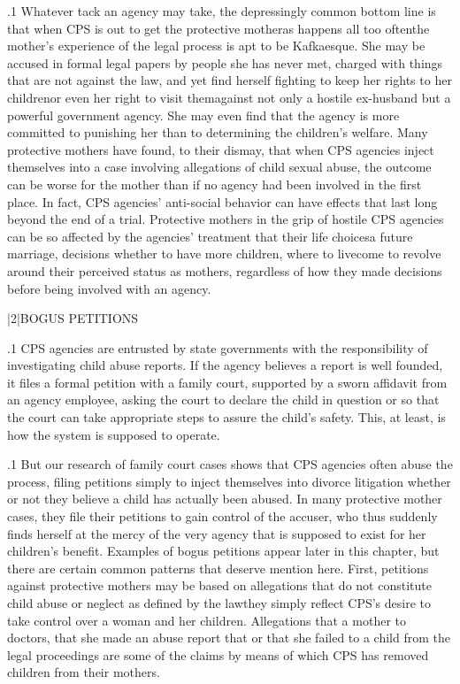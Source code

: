 \documentclass[11pt, twoside]{article}
\begin{document}
{\p.1{%
Whatever tack an agency may take, the depressingly common bottom
line is that when CPS is out to get the protective mother\mdash{}as happens
all too often\mdash{}the mother's experience of the legal process is apt to be
Kafkaesque. She may be accused in formal legal papers by people she
has never met, charged with things that are not against the law, and yet
find herself fighting to keep her rights to her children\mdash{}or even her right
to visit them\mdash{}against not only a hostile ex-husband but a powerful government agency. She may even find that the agency is more committed
to punishing her than to determining the children's welfare.
Many protective mothers have found, to their dismay, that when CPS
agencies inject themselves into a case involving allegations of child sexual abuse, the outcome can be worse for the mother than if no agency
had been involved in the first place.
In fact, CPS agencies' anti-social behavior can have effects that last
long beyond the end of a trial. Protective mothers in the grip of hostile
CPS agencies can be so affected by the agencies' treatment that their life
choices\mdash{}a future marriage, decisions whether to have more children,
where to live\mdash{}come to revolve around their perceived status as  mothers, regardless of how they made decisions before being
involved with an agency.
}%


\s|2|{BOGUS PETITIONS}

\p.1{%
\noindent{}CPS agencies are entrusted by state governments with the responsibility
of investigating child abuse reports. If the agency believes a report is
well founded, it files a formal petition with a family court, supported by
a sworn affidavit from an agency employee, asking the court to declare
the child in question  or  so that the court can take
appropriate steps to assure the child's safety. This, at least, is how the
system is supposed to operate.
}%

\p.1{%
But our research of family court cases shows that CPS agencies often abuse the process, filing petitions simply to inject themselves into
divorce litigation whether or not they believe a child has actually been
abused. In many protective mother cases, they file their petitions to gain control of the accuser, who thus suddenly finds herself at the mercy of
the very agency that is supposed to exist for her children's benefit.
Examples of bogus petitions appear later in this chapter, but there are
certain common patterns that deserve mention here.
First, petitions against protective mothers may be based on allegations that do not constitute child abuse or neglect as defined by the
law\mdash{}they simply reflect CPS's desire to take control over a woman and
her children. Allegations that a mother  to
doctors, that she made an abuse report that  or
that she failed to  a child from the legal proceedings are some
of the claims by means of which CPS has removed children from their
mothers.
}%

}
\end{document}
